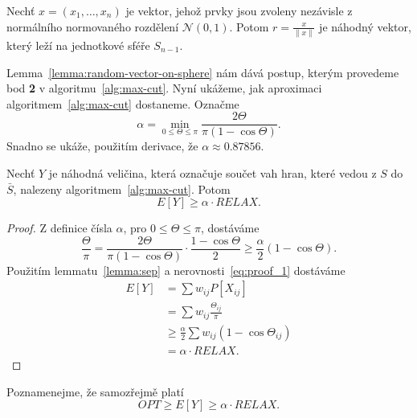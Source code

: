 \begin{lm}\cite{seminumerical-algorithms}
    Nechť $x = (x_1, \dots, x_n)$ je vektor, jehož prvky jsou zvoleny nezávisle z normálního normovaného rozdělení $\mathcal{N}(0,1)$. Potom $r = \frac{x}{\| x \|}$ je náhodný vektor, který leží na jednotkové sféře $S_{n-1}$.
    \label{lemma:random-vector-on-sphere}
\end{lm}

Lemma~\ref{lemma:random-vector-on-sphere} nám dává postup, kterým provedeme bod \textbf{2} v algoritmu~\ref{alg:max-cut}. Nyní ukážeme, jak  aproximaci algoritmem~\ref{alg:max-cut} dostaneme. Označme
$$
    \alpha = \min_{0 \leq \Theta \leq \pi} \frac{2 \Theta}{\pi (1 - \cos \Theta)}.
$$
Snadno se ukáže, použitím derivace, že $\alpha \approx 0.87856$.

\begin{lm}\cite{max-cut}
    Nechť $Y$ je náhodná veličina, která označuje součet vah hran, které vedou z $S$ do $\bar{S}$, nalezeny algoritmem~\ref{alg:max-cut}. Potom
    $$
        E\left[ Y \right] \geq \alpha \cdot RELAX.
    $$
\end{lm}

\begin{proof}
    Z definice čísla $\alpha$, pro $0 \leq \Theta \leq \pi$, dostáváme
    \begin{equation}
        \frac{\Theta}{\pi} = \frac{2 \Theta}{\pi (1 - \cos \Theta)} \cdot \frac{1 - \cos \Theta}{2} \geq \frac{\alpha}{2} (1 - \cos \Theta).
        \label{eq:proof_1}
    \end{equation}
    Použitím lemmatu~\ref{lemma:sep} a nerovnosti~\ref{eq:proof_1} dostáváme
    \begin{equation*}
        \begin{split}
            E\left[ Y \right] &= \sum w_{ij} P\left[ X_{ij} \right] \\
                              &= \sum w_{ij} \frac{\Theta_{ij}}{\pi} \\
                              &\geq \frac{\alpha}{2} \sum w_{ij} (1 - \cos \Theta_{ij}) \\
                              &= \alpha \cdot RELAX.
        \end{split}
    \end{equation*}
\end{proof}

\noindent Poznamenejme, že samozřejmě platí
\begin{equation}
    OPT \geq E\left[ Y \right] \geq \alpha \cdot RELAX.
    \label{eq:int-gap}
\end{equation}

